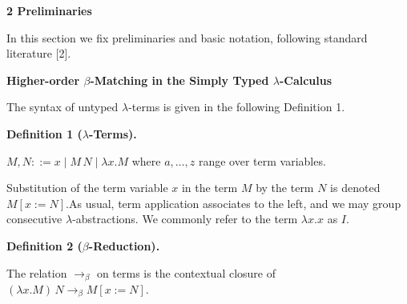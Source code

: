 
 
\par\medskip\noindent\textbf{2 Preliminaries}\par
 
 
In this section we fix preliminaries and basic notation, following standard literature [2].\par
 
 
 
\par\medskip\noindent\textbf{Higher-order $\beta$-Matching in the Simply Typed $\lambda$-Calculus}\par
 
 
The syntax of untyped $\lambda$-terms is given in the following Definition 1.\par
 
 
 
\par\medskip\noindent\textbf{Definition 1 ($\lambda$-Terms).}\par
 
 
$M,N::=x\mid M\,N\mid\lambda x.M$ where $a,\ldots,z$ range over term variables.\par
 
 
 
 
Substitution of the term variable $x$ in the term $M$ by the term $N$ is denoted $M[x:=N]$.As usual, term application associates to the left, and we may group consecutive $\lambda$-abstractions. We commonly refer to the term $\lambda x.x$ as $I$.\par
 
 
 
\par\medskip\noindent\textbf{Definition 2 ($\beta$-Reduction).}\par
 
 
The relation $\to_{\beta}$ on terms is the contextual closure of $(\lambda x.M)\,N\to_{\beta}M[x:=N]$.\par
 
